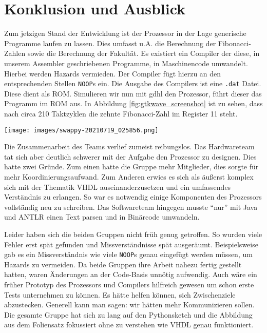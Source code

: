 \documentclass[paper=a4,fontsize=11pt,twocolumn]{scrreprt}
\begin{document}
\chapter{Konklusion und Ausblick}
\label{ch:konklusion_und_ausblick}
Zum jetzigen Stand der Entwicklung ist der Prozessor in der Lage generische Programme laufen zu lassen.
Dies umfasst u.A. die Berechnung der Fibonacci-Zahlen sowie die Berechnung der Fakultät.
Es existiert ein Compiler der diese, in unserem Assembler geschriebenen Programme, in Maschinencode umwandelt.
Hierbei werden Hazards vermieden.
Der Compiler fügt hierzu an den entsprechenden Stellen \texttt{NOOP}s ein.
Die Ausgabe des Compilers ist eine \texttt{.dat} Datei.
Diese dient als ROM.
Simulieren wir nun mit gdhl den Prozessor, führt dieser das Programm im ROM aus.
In Abbildung \ref{fig:gtkwave_screenshot} ist zu sehen, dass nach circa 210 Taktzyklen die zehnte Fibonacci-Zahl im Register 11 steht.

\begin{figure*}[t]
    \centering
    \texttt{[image: images/swappy-20210719\_025856.png]}
    \caption{GTKWave mit dem finalen Resultat des Fibonacci-Programms}
    \label{fig:gtkwave_screenshot}
\end{figure*}

Die Zusammenarbeit des Teams verlief zumeist reibungslos.
Das Hardwareteam tat sich aber deutlich schwerer mit der Aufgabe den Prozessor zu designen.
Dies hatte zwei Gründe.
Zum einen hatte die Gruppe mehr Mitglieder, dies sorgte für mehr Koordinierungsaufwand.
Zum Anderen erwies es sich als äußerst komplex sich mit der Thematik VHDL auseinanderzusetzen und ein umfassendes Verständnis zu erlangen.
So war es notwendig einige Komponenten des Prozessors vollständig neu zu schreiben.
Das Softwareteam hingegen musste \enquote{nur} mit Java und ANTLR einen Text parsen und in Binärcode umwandeln.

Leider haben sich die beiden Gruppen nicht früh genug getroffen.
So wurden viele Fehler erst spät gefunden und Missverständnisse spät ausgeräumt.
Beispielsweise gab es ein Missverständnis wie viele \texttt{NOOP}s genau eingefügt werden müssen, um Hazards zu vermeiden.
Da beide Gruppen ihre Arbeit nahezu fertig gestellt hatten, waren Änderungen an der Code-Basis unnötig aufwendig.
Auch wäre ein früher Prototyp des Prozessors und Compilers hilfreich gewesen um schon erste Tests unternehmen zu können.
Es hätte helfen können, sich Zwischenziele abzustecken.
Generell kann man sagen: wir hätten mehr Kommunizieren sollen.
Die gesamte Gruppe hat sich zu lang auf den Pythonsketch und die Abbildung aus dem Foliensatz fokussiert ohne zu verstehen wie VHDL genau funktioniert.
\end{document}
